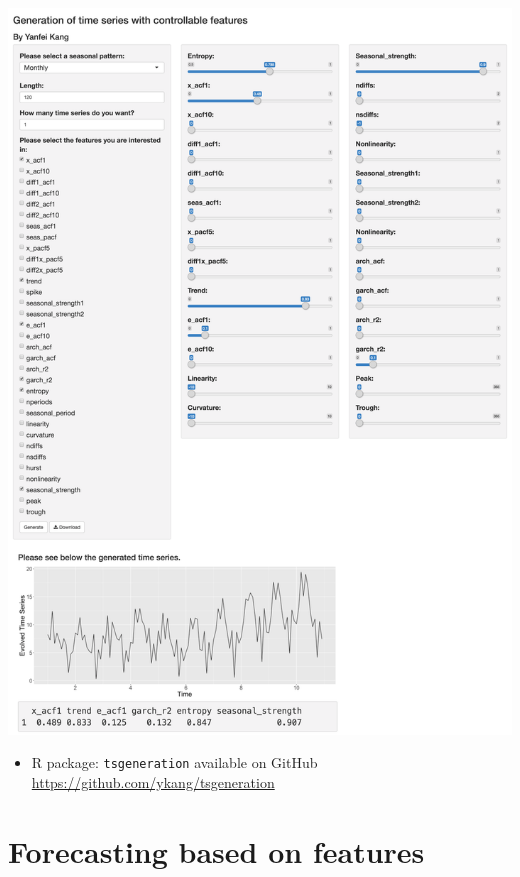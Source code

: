 \documentclass[11pt,ignorenonframetext,compress]{beamer}
\begin{document}
\begin{frame}{}

  \centerline{\includegraphics[height=0.8\textheight]{figures/TSgenerationApp}}

    \begin{itemize}
  \item R package: {\color{blue}\texttt{tsgeneration}} {\footnotesize available on GitHub \url{https://github.com/ykang/tsgeneration}}
  \end{itemize}

\end{frame}

\section{Forecasting based on features}\label{forecasting-based-on-features}
\end{document}
